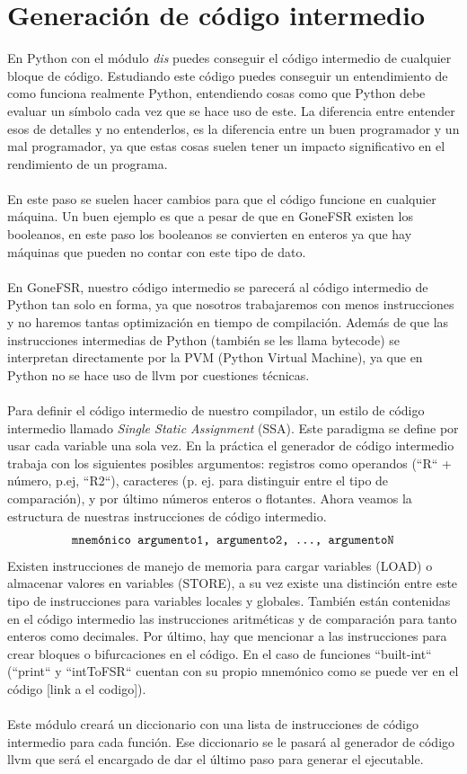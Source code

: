 \section{Generación de código intermedio}
En Python con el módulo \textit{dis} puedes conseguir el código intermedio de cualquier bloque de código. Estudiando este código puedes conseguir un entendimiento de como funciona realmente Python, entendiendo cosas como que Python debe evaluar un símbolo cada vez que se hace uso de este. La diferencia entre entender esos de detalles y no entenderlos, es la diferencia entre un buen programador y un mal programador, ya que estas cosas suelen tener un impacto significativo en el rendimiento de un programa. \\\\
\noindent En este paso se suelen hacer cambios para que el código funcione en cualquier máquina. Un buen ejemplo es que a pesar de que en GoneFSR existen los booleanos, en este paso los booleanos se convierten en enteros ya que hay máquinas que pueden no contar con este tipo de dato. \\\\
En GoneFSR, nuestro código intermedio se parecerá al código intermedio de Python tan solo en forma, ya que nosotros trabajaremos con menos instrucciones y no haremos tantas optimización en tiempo de compilación. Además de que las instrucciones intermedias de Python (también se les llama bytecode) se interpretan directamente por la PVM (Python Virtual Machine), ya que en Python no se hace uso de llvm por cuestiones técnicas. \\\\

Para definir el código intermedio de nuestro compilador, un estilo de código intermedio llamado \textit{Single Static Assignment} (SSA). Este paradigma se define por usar cada variable una sola vez. En la práctica el generador de código intermedio trabaja con los siguientes posibles argumentos: registros como operandos (``R`` + número, p.ej, ``R2``), caracteres (p. ej. para distinguir entre el tipo de comparación), y por último números enteros o flotantes. Ahora veamos la estructura de nuestras instrucciones de código intermedio.
\[ 
\texttt{ mnemónico argumento1, argumento2, \dots, argumentoN } 
\]
Existen instrucciones de manejo de memoria para cargar variables (LOAD) o almacenar valores en variables (\textsc{STORE}), a su vez existe una distinción entre este tipo de instrucciones para variables locales y globales. También están contenidas en el código intermedio las instrucciones aritméticas y de comparación para tanto enteros como decimales. Por último, hay que mencionar a las instrucciones para crear bloques o bifurcaciones en el código. En el caso de funciones ``built-int`` (``print`` y ``intToFSR`` cuentan con su propio mnemónico como se puede ver en el código [link a el codigo]).\\\\
Este módulo creará un diccionario con una lista de instrucciones de código intermedio para cada función. Ese diccionario se le pasará al generador de código llvm que será el encargado de dar el último paso para generar el ejecutable. 
